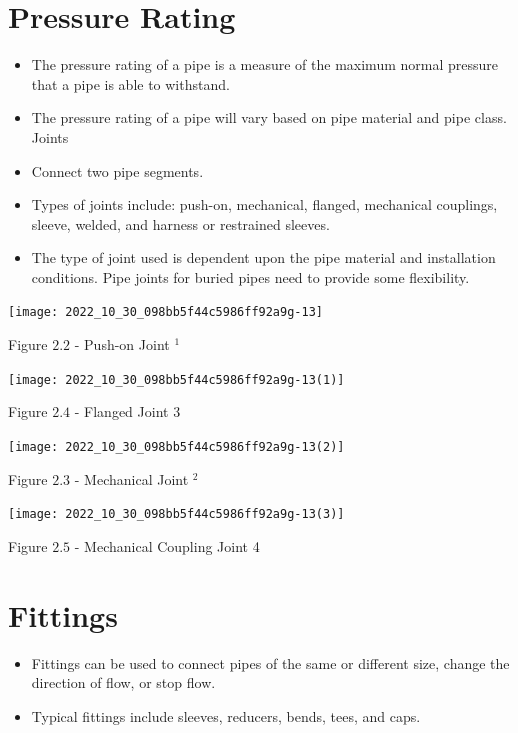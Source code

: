 \documentclass[10pt]{article}
\begin{document}
\section{Pressure Rating}
\begin{itemize}
  \item The pressure rating of a pipe is a measure of the maximum normal pressure that a pipe is able to withstand.

  \item The pressure rating of a pipe will vary based on pipe material and pipe class. Joints

  \item Connect two pipe segments.

  \item Types of joints include: push-on, mechanical, flanged, mechanical couplings, sleeve, welded, and harness or restrained sleeves.

  \item The type of joint used is dependent upon the pipe material and installation conditions. Pipe joints for buried pipes need to provide some flexibility.

\end{itemize}
\texttt{[image: 2022\_10\_30\_098bb5f44c5986ff92a9g-13]}

Figure $2.2$ - Push-on Joint ${ }^{1}$

\texttt{[image: 2022\_10\_30\_098bb5f44c5986ff92a9g-13(1)]}

Figure $2.4$ - Flanged Joint 3

\texttt{[image: 2022\_10\_30\_098bb5f44c5986ff92a9g-13(2)]}

Figure $2.3$ - Mechanical Joint ${ }^{2}$

\texttt{[image: 2022\_10\_30\_098bb5f44c5986ff92a9g-13(3)]}

Figure $2.5$ - Mechanical Coupling Joint 4

\section{Fittings}
\begin{itemize}
  \item Fittings can be used to connect pipes of the same or different size, change the direction of flow, or stop flow.

  \item Typical fittings include sleeves, reducers, bends, tees, and caps.

\end{itemize}
\end{document}
